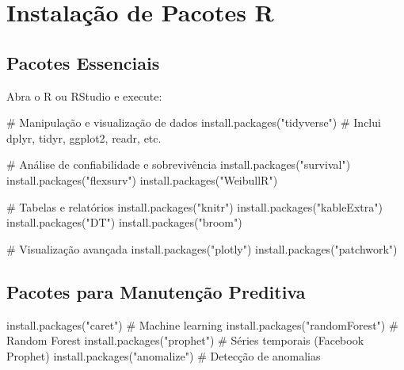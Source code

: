 \documentclass[
  letterpaper,
]{book}
\newenvironment{Shaded}{\begin{snugshade}}{\end{snugshade}}
\newcommand{\CommentTok}[1]{\textcolor[rgb]{0.37,0.37,0.37}{#1}}
\newcommand{\FunctionTok}[1]{\textcolor[rgb]{0.28,0.35,0.67}{#1}}
\newcommand{\NormalTok}[1]{\textcolor[rgb]{0.00,0.23,0.31}{#1}}
\newcommand{\StringTok}[1]{\textcolor[rgb]{0.13,0.47,0.30}{#1}}
\begin{document}
\section*{Instalação de Pacotes R}\label{instalauxe7uxe3o-de-pacotes-r}


\subsection*{Pacotes Essenciais}\label{pacotes-essenciais}

Abra o R ou RStudio e execute:

\begin{Shaded}
\begin{Highlighting}[]
\CommentTok{\# Manipulação e visualização de dados}
\FunctionTok{install.packages}\NormalTok{(}\StringTok{"tidyverse"}\NormalTok{) }\CommentTok{\# Inclui dplyr, tidyr, ggplot2, readr, etc.}

\CommentTok{\# Análise de confiabilidade e sobrevivência}
\FunctionTok{install.packages}\NormalTok{(}\StringTok{"survival"}\NormalTok{)}
\FunctionTok{install.packages}\NormalTok{(}\StringTok{"flexsurv"}\NormalTok{)}
\FunctionTok{install.packages}\NormalTok{(}\StringTok{"WeibullR"}\NormalTok{)}

\CommentTok{\# Tabelas e relatórios}
\FunctionTok{install.packages}\NormalTok{(}\StringTok{"knitr"}\NormalTok{)}
\FunctionTok{install.packages}\NormalTok{(}\StringTok{"kableExtra"}\NormalTok{)}
\FunctionTok{install.packages}\NormalTok{(}\StringTok{"DT"}\NormalTok{)}
\FunctionTok{install.packages}\NormalTok{(}\StringTok{"broom"}\NormalTok{)}

\CommentTok{\# Visualização avançada}
\FunctionTok{install.packages}\NormalTok{(}\StringTok{"plotly"}\NormalTok{)}
\FunctionTok{install.packages}\NormalTok{(}\StringTok{"patchwork"}\NormalTok{)}
\end{Highlighting}
\end{Shaded}

\subsection*{Pacotes para Manutenção
Preditiva}\label{pacotes-para-manutenuxe7uxe3o-preditiva}

\begin{Shaded}
\begin{Highlighting}[]
\FunctionTok{install.packages}\NormalTok{(}\StringTok{"caret"}\NormalTok{) }\CommentTok{\# Machine learning}
\FunctionTok{install.packages}\NormalTok{(}\StringTok{"randomForest"}\NormalTok{) }\CommentTok{\# Random Forest}
\FunctionTok{install.packages}\NormalTok{(}\StringTok{"prophet"}\NormalTok{) }\CommentTok{\# Séries temporais (Facebook Prophet)}
\FunctionTok{install.packages}\NormalTok{(}\StringTok{"anomalize"}\NormalTok{) }\CommentTok{\# Detecção de anomalias}
\end{Highlighting}
\end{Shaded}
\end{document}
